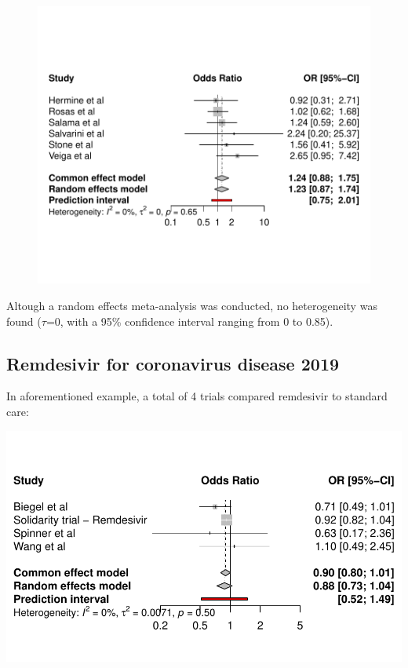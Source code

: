 \documentclass[
  letterpaper,
  DIV=11,
  numbers=noendperiod]{scrreprt}
\begin{document}
\begin{figure}[H]

{\centering \includegraphics{chapter_10_files/figure-pdf/unnamed-chunk-6-1.pdf}

}

\end{figure}

Altough a random effects meta-analysis was conducted, no heterogeneity
was found (\(\tau\)=0, with a 95\% confidence interval ranging from 0 to
0.85).

\hypertarget{remdesivir-for-coronavirus-disease-2019}{%
\subsection{Remdesivir for coronavirus disease
2019}\label{remdesivir-for-coronavirus-disease-2019}}

In aforementioned example, a total of 4 trials compared remdesivir to
standard care:

\includegraphics{chapter_10_files/figure-pdf/unnamed-chunk-7-1.pdf}
\end{document}
